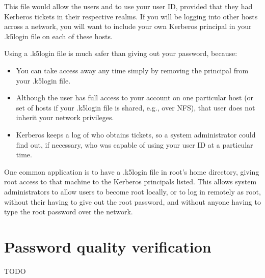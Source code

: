 \documentclass[letterpaper,10pt,english]{sphinxmanual}
\begin{document}
\begin{sphinxVerbatim}[commandchars=\\\{\}]
\end{sphinxVerbatim}

\sphinxAtStartPar
This file would allow the users  and  to use your
user ID, provided that they had Kerberos tickets in their respective
realms.  If you will be logging into other hosts across a network, you
will want to include your own Kerberos principal in your .k5login file
on each of these hosts.

\sphinxAtStartPar
Using a .k5login file is much safer than giving out your password,
because:
\begin{itemize}
\item {} 
\sphinxAtStartPar
You can take access away any time simply by removing the principal
from your .k5login file.

\item {} 
\sphinxAtStartPar
Although the user has full access to your account on one particular
host (or set of hosts if your .k5login file is shared, e.g., over
NFS), that user does not inherit your network privileges.

\item {} 
\sphinxAtStartPar
Kerberos keeps a log of who obtains tickets, so a system
administrator could find out, if necessary, who was capable of using
your user ID at a particular time.

\end{itemize}

\sphinxAtStartPar
One common application is to have a .k5login file in root’s home
directory, giving root access to that machine to the Kerberos
principals listed.  This allows system administrators to allow users
to become root locally, or to log in remotely as root, without their
having to give out the root password, and without anyone having to
type the root password over the network.


\section{Password quality verification}
\label{\detokenize{user/pwd_mgmt:password-quality-verification}}
\sphinxAtStartPar
TODO

\sphinxstepscope
\end{document}
